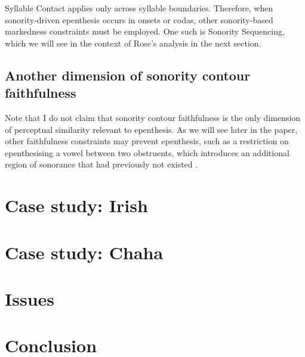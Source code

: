 \documentclass[12pt]{article}
\begin{document}
\bigskip

Syllable Contact applies only across syllable boundaries.  Therefore, when sonority-driven epenthesis occurs in onsets or codas, other sonority-based markedness constraints must be employed.  One such is {\sc Sonority Sequencing}, which we will see in the context of Rose's analysis in the next section.

 
\subsection{Another dimension of sonority contour faithfulness}

Note that I do not claim that sonority contour faithfulness is the only dimension of perceptual similarity relevant to epenthesis. As we will see later in the paper, other faithfulness constraints may prevent epenthesis, such as a restriction on epenthesising a vowel between two obstruents, which introduces an additional region of sonorance that had previously not existed \citep{flemming.2008}.



\section{Case study: Irish} \label{irish}

\section{Case study: Chaha} \label{chaha}

\section{Issues} \label{issues}

\section{Conclusion} \label{conclusion}



\end{document}
